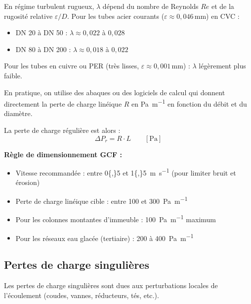 \begin{definition}[title=Coefficient de frottement $\lambda$ — diagramme de Moody]
En régime turbulent rugueux, $\lambda$ dépend du nombre de Reynolds $Re$ et de la rugosité relative $\varepsilon/D$. Pour les tubes acier courants ($\varepsilon \approx 0{,}046$\,mm) en CVC :
\begin{itemize}
  \item DN 20 à DN 50 : $\lambda \approx 0{,}022$ à $0{,}028$
  \item DN 80 à DN 200 : $\lambda \approx 0{,}018$ à $0{,}022$
\end{itemize}
Pour les tubes en cuivre ou PER (très lisses, $\varepsilon \approx 0{,}001$\,mm) : $\lambda$ légèrement plus faible.
\end{definition}

\begin{methode}[title=Utilisation des abaques de pertes de charge]
En pratique, on utilise des abaques ou des logiciels de calcul qui donnent directement la perte de charge linéique $R$ en \si{\pascal\per\metre} en fonction du débit et du diamètre.

La perte de charge régulière est alors :
\begin{equation}
  \Delta P_r = R \cdot L \qquad \left[\si{\pascal}\right]
\end{equation}

\textbf{Règle de dimensionnement GCF :}
\begin{itemize}
  \item Vitesse recommandée : entre \SI{0{,}5}{} et \SI{1{,}5}{\metre\per\second} (pour limiter bruit et érosion)
  \item Perte de charge linéique cible : entre \SI{100}{} et \SI{300}{\pascal\per\metre}
  \item Pour les colonnes montantes d'immeuble : \SI{100}{\pascal\per\metre} maximum
  \item Pour les réseaux eau glacée (tertiaire) : \SI{200}{} à \SI{400}{\pascal\per\metre}
\end{itemize}
\end{methode}

\subsection{Pertes de charge singulières}

Les pertes de charge singulières sont dues aux perturbations locales de l'écoulement (coudes, vannes, réducteurs, tés, etc.).

